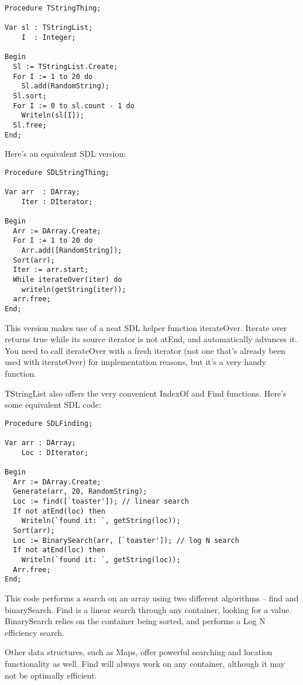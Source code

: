 \documentclass{report}
\begin{document}
\begin{lstlisting}
Procedure TStringThing;

Var sl : TStringList;
    I  : Integer;

Begin
  Sl := TStringList.Create;
  For I := 1 to 20 do
    Sl.add(RandomString);
  Sl.sort;
  For I := 0 to sl.count - 1 do
    Writeln(sl[I]);
  Sl.free;
End;
\end{lstlisting}

Here's an equivalent SDL version:

\begin{lstlisting}
Procedure SDLStringThing;

Var arr  : DArray;
    Iter : DIterator;

Begin
  Arr := DArray.Create;
  For I := 1 to 20 do
    Arr.add([RandomString]);
  Sort(arr);
  Iter := arr.start;
  While iterateOver(iter) do
    writeln(getString(iter));
  arr.free;
End;
\end{lstlisting}

This version makes use of a neat SDL helper function iterateOver. Iterate 
over returns true while its source iterator is not atEnd, and automatically
advances it. You need to call iterateOver with a fresh iterator (not one
that's already been used with iterateOver) for implementation reasons, but
it's a very handy function.

TStringList also offers the very convenient IndexOf and Find functions.
Here's some equivalent SDL code:

\begin{lstlisting}
Procedure SDLFinding;

Var arr : DArray;
    Loc : DIterator;

Begin
  Arr := DArray.Create;
  Generate(arr, 20, RandomString);
  Loc := find([`toaster']); // linear search
  If not atEnd(loc) then
    Writeln(`found it: `, getString(loc));
  Sort(arr);
  Loc := BinarySearch(arr, [`toaster']); // log N search
  If not atEnd(loc) then
    Writeln(`found it: `, getString(loc));
  Arr.free;
End;
\end{lstlisting}

This code performs a search on an array using two different algorithms --
find and binarySearch. Find is a linear search through any container,
looking for a value. BinarySearch relies on the container being sorted, and
performs a Log N efficiency search.

Other data structures, such as Maps, offer powerful searching and location
functionality as well. Find will always work on any container, although it
may not be optimally efficient.
\end{document}
